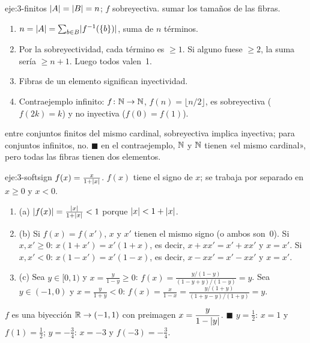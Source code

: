 \begin{solucion}{eje:3-finitos}
\datos $\lvert A\rvert=\lvert B\rvert=n$; $f$ sobreyectiva.
\planteamiento sumar los tamaños de las fibras.
\pasos
\begin{enumerate}[label=\arabic*.]
  \item $n=\lvert A\rvert=\sum_{b\in B}\lvert f^{-1}(\{b\})\rvert$, suma de $n$ términos.
  \item Por la sobreyectividad, cada término es $\ge1$. Si alguno fuese $\ge2$, la suma sería $\ge n+1$. Luego todos valen~1.
  \item Fibras de un elemento significan inyectividad.
  \item Contraejemplo infinito: $f\colon\mathbb{N}\to\mathbb{N}$, $f(n)=\lfloor n/2\rfloor$, es sobreyectiva ($f(2k)=k$) y no inyectiva ($f(0)=f(1)$).
\end{enumerate}
\resultado entre conjuntos finitos del mismo cardinal, sobreyectiva implica inyectiva; para conjuntos infinitos, no. \hfill$\blacksquare$
\comprobacion en el contraejemplo, $\mathbb{N}$ y $\mathbb{N}$ tienen «el mismo cardinal», pero todas las fibras tienen dos elementos.
\end{solucion}

\begin{solucion}{eje:3-softsign}
\datos $f(x)=\tfrac{x}{1+\lvert x\rvert}$.
\planteamiento $f(x)$ tiene el signo de $x$; se trabaja por separado en $x\ge0$ y $x<0$.
\pasos
\begin{enumerate}[label=\arabic*.]
  \item (a) $\lvert f(x)\rvert=\tfrac{\lvert x\rvert}{1+\lvert x\rvert}<1$ porque $\lvert x\rvert<1+\lvert x\rvert$.
  \item (b) Si $f(x)=f(x')$, $x$ y $x'$ tienen el mismo signo (o ambos son~0). Si $x,x'\ge0$: $x(1+x')=x'(1+x)$, es decir, $x+xx'=x'+xx'$ y $x=x'$. Si $x,x'<0$: $x(1-x')=x'(1-x)$, es decir, $x-xx'=x'-xx'$ y $x=x'$.
  \item (c) Sea $y\in[0,1)$ y $x=\tfrac{y}{1-y}\ge0$: $f(x)=\tfrac{y/(1-y)}{(1-y+y)/(1-y)}=y$. Sea $y\in(-1,0)$ y $x=\tfrac{y}{1+y}<0$: $f(x)=\tfrac{x}{1-x}=\tfrac{y/(1+y)}{(1+y-y)/(1+y)}=y$.
\end{enumerate}
\resultado $f$ es una biyección $\mathbb{R}\to(-1,1)$ con preimagen $x=\dfrac{y}{1-\lvert y\rvert}$. \hfill$\blacksquare$
\comprobacion $y=\tfrac12$: $x=1$ y $f(1)=\tfrac12$; $y=-\tfrac34$: $x=-3$ y $f(-3)=-\tfrac34$.
\end{solucion}

